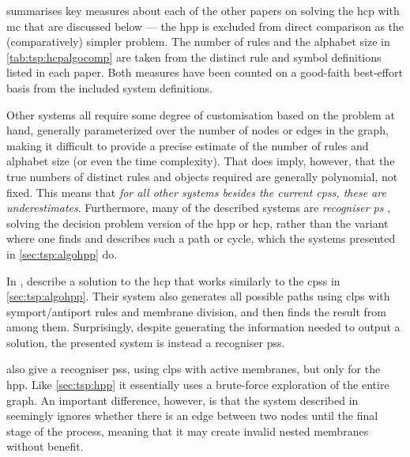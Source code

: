  summarises key measures about each of the other papers on solving the \gls{hcp} with \gls{mc} that are discussed below --- the \gls{hpp} is excluded from direct comparison as the (comparatively) simpler problem.  The number of rules and the alphabet size in \cref{tab:tsp:hcpalgocomp} are taken from the distinct rule and symbol definitions listed in each paper.  Both measures have been counted on a good-faith best-effort basis from the included system definitions.

Other systems all require some degree of customisation based on the problem at hand, generally parameterized over the number of nodes or edges in the graph, making it difficult to provide a precise estimate of the number of rules and alphabet size (or even the time complexity).  That does imply, however, that the true numbers of distinct rules and objects required are generally polynomial, not fixed.  This means that \emph{for all other systems besides the current \glspl{cps}, these are underestimates}.  Furthermore, many of the described systems are \emph{recogniser \gls{ps}} \cite[Ch.~12.2]{Paun2010b}, solving the decision problem version of the \gls{hpp} or \gls{hcp}, rather than the variant where one finds and describes such a path or cycle, which the systems presented in \cref{sec:tsp:algohpp} do.


In \cite{Orellana-Martin2019a}, \citeauthor{Orellana-Martin2019a} describe a solution to the \gls{hcp} that works similarly to the \glspl{cps} in \cref{sec:tsp:algohpp}.  Their system also generates all possible paths using \gls{clps} with symport/antiport rules and membrane division, and then finds the result from among them.  Surprisingly, despite generating the information needed to output a solution, the presented system is instead a recogniser \glspl{ps}.


\citeauthor{Chen2009} \cite{Chen2009} also give a recogniser \glspl{ps}, using \gls{clps} with active membranes, but only for the \gls{hpp}.  Like \cref{sec:tsp:hpp} it essentially uses a brute-force exploration of the entire graph.  An important difference, however, is that the system described in \cite{Chen2009} seemingly ignores whether there is an edge between two nodes until the final stage of the process, meaning that it may create invalid nested membranes without benefit.

